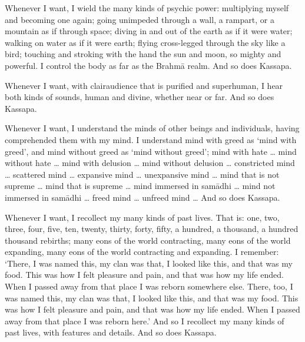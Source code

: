 \documentclass[12pt,openany]{book}%
\begin{document}
Whenever I want, I wield the many kinds of psychic power: multiplying myself and becoming one again; going unimpeded through a wall, a rampart, or a mountain as if through space; diving in and out of the earth as if it were water; walking on water as if it were earth; flying cross-legged through the sky like a bird; touching and stroking with the hand the sun and moon, so mighty and powerful. I control the body as far as the \textsanskrit{Brahmā} realm. And so does Kassapa. 

Whenever I want, with clairaudience that is purified and superhuman, I hear both kinds of sounds, human and divine, whether near or far. And so does Kassapa. 

Whenever I want, I understand the minds of other beings and individuals, having comprehended them with my mind. I understand mind with greed as ‘mind with greed’, and mind without greed as ‘mind without greed’; mind with hate … mind without hate … mind with delusion … mind without delusion … constricted mind … scattered mind … expansive mind … unexpansive mind … mind that is not supreme … mind that is supreme … mind immersed in \textsanskrit{samādhi} … mind not immersed in \textsanskrit{samādhi} … freed mind … unfreed mind … And so does Kassapa. 

Whenever I want, I recollect my many kinds of past lives. That is: one, two, three, four, five, ten, twenty, thirty, forty, fifty, a hundred, a thousand, a hundred thousand rebirths; many eons of the world contracting, many eons of the world expanding, many eons of the world contracting and expanding. I remember: ‘There, I was named this, my clan was that, I looked like this, and that was my food. This was how I felt pleasure and pain, and that was how my life ended. When I passed away from that place I was reborn somewhere else. There, too, I was named this, my clan was that, I looked like this, and that was my food. This was how I felt pleasure and pain, and that was how my life ended. When I passed away from that place I was reborn here.’ And so I recollect my many kinds of past lives, with features and details. And so does Kassapa. 
\end{document}

